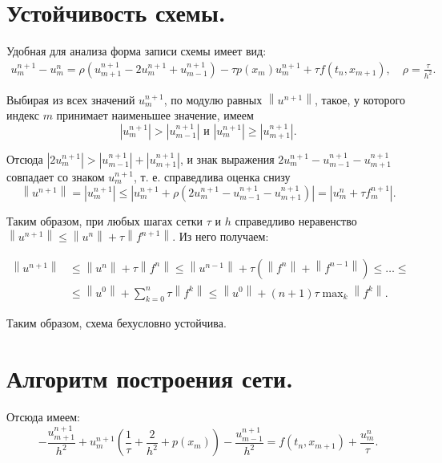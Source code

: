 \documentclass[14pt,a4paper]{extarticle}
\newcommand{\1}{\mathbbm{1}}
\begin{document}
\section{Устойчивость схемы.}
Удобная для анализа форма записи схемы имеет вид:
\begin{align*}
    u_m^{n+1} - u_m^n = \rho (u_{m+1}^{n+1} - 2 u_{m}^{n+1} + u_{m-1}^{n+1}) - \tau p(x_m) u_m^{n+1} + \tau f(t_{n}, x_{m+1}), \quad \rho = \frac{\tau}{h^2}.
\end{align*}

Выбирая из всех значений $u_m^{n+1}$, по модулю равных $\left\|u^{n+1}\right\|$, такое, у которого индекс $m$ принимает наименьшее значение, имеем
$$
\left|u_m^{n+1}\right|>\left|u_{m-1}^{n+1}\right| \text { и }\left|u_m^{n+1}\right| \geqslant\left|u_{m+1}^{n+1}\right| .
$$

Отсюда $\left|2 u_m^{n+1}\right|>\left|u_{m-1}^{n+1}\right|+\left|u_{m+1}^{n+1}\right|$, и знак выражения $2 u_m^{n+1}-u_{m-1}^{n+1}-u_{m+1}^{n+1}$ совпадает со знаком $u_m^{n+1}$, т. е. справедлива оценка снизу
$$
\left\|u^{n+1}\right\|=\left|u_m^{n+1}\right| \leq \left|u_m^{n+1}+\rho\left(2 u_m^{n+1}-u_{m-1}^{n+1}-u_{m+1}^{n+1}\right)\right|=\left|u_m^n+\tau f_m^{n+1}\right| .
$$

Таким образом, при любых шагах сетки $\tau$ и $h$ справедливо неравенство $\left\|u^{n+1}\right\| \leq \left\|u^n\right\|+\tau\left\|f^{n+1}\right\|$. Из него 
получаем:

$\begin{aligned}\left\|u^{n+1}\right\| & \leq \left\|u^n\right\| +\tau\left\|f^n\right\| 
     \leq \left\|u^{n-1}\right\|+\tau\left(\left\|f^n\right\|+\left\|f^{n-1}\right\|\right) 
    \leq  \ldots \leq \\ &\leq \left\|u^0\right\|+\sum_{k=0}^n \tau\left\|f^k\right\|
    \leq \left\|u^0\right\|+(n+1) \tau \max _k\left\|f^k\right\| .\end{aligned}$

Таким образом, схема бехусловно устойчива.

\section{Алгоритм построения сети.}
Отсюда имеем:
\begin{equation*} \label{scheme1}
    -\frac{u_{m+1}^{n+1}}{h^2} + u_m^{n+1} (\frac{1}{\tau} 
    + \frac{2}{h^2} + p(x_m)) - \frac{u_{m-1}^{n+1}}{h^2} = f(t_{n}, x_{m+1}) + \frac{u_m^n}{\tau}.
\end{equation*}
\end{document}
